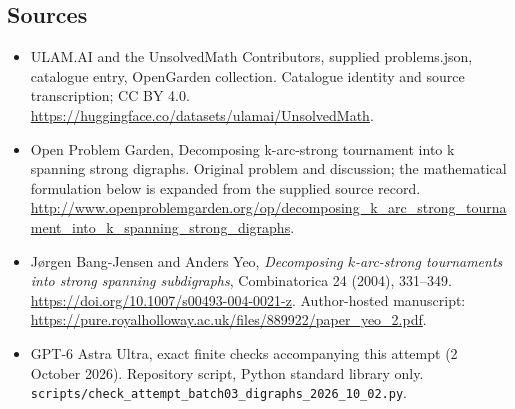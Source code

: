 \documentclass[11pt,a4paper]{article}
\begin{document}
\subsection{Sources}
\begin{itemize}
\item[S1] ULAM.AI and the UnsolvedMath Contributors, supplied problems.json, catalogue entry, OpenGarden collection. Catalogue identity and source transcription; CC BY 4.0.
\url{https://huggingface.co/datasets/ulamai/UnsolvedMath}.
\item[S2] Open Problem Garden, Decomposing k-arc-strong tournament into k spanning strong digraphs. Original problem and discussion; the mathematical formulation below is expanded from the supplied source record.
\url{http://www.openproblemgarden.org/op/decomposing_k_arc_strong_tournament_into_k_spanning_strong_digraphs}.
\item[S3] J\o rgen Bang-Jensen and Anders Yeo, \emph{Decomposing $k$-arc-strong tournaments into strong spanning subdigraphs}, Combinatorica 24 (2004), 331--349. \url{https://doi.org/10.1007/s00493-004-0021-z}. Author-hosted manuscript: \url{https://pure.royalholloway.ac.uk/files/889922/paper_yeo_2.pdf}.
\item[S9] GPT-6 Astra Ultra, exact finite checks accompanying this attempt (2 October 2026). Repository script, Python standard library only. \texttt{scripts/check\_attempt\_batch03\_digraphs\_2026\_10\_02.py}.
\end{itemize}
\end{document}
